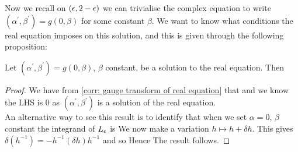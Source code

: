 \documentclass{article}
\begin{document}
Now we recall on $(\epsilon,2-\epsilon)$ we can trivialise the complex equation to write $(\alpha^\prime, \beta^\prime) = g(0,\beta)$ for some constant $\beta$. We want to know what conditions the real equation imposes on this solution, and this is given through the following proposition:
\begin{prop}
	Let $(\alpha^\prime, \beta^\prime) = g(0,\beta)$, $\beta$ constant, be a solution to the real equation. Then 
\end{prop}
\begin{proof}
We have from \ref{corr: gauge transform of real equation} that 
and we know the LHS is 0 as $(\alpha^\prime, \beta^\prime)$ is a solution of the real equation. \\
An alternative way to see this result is to identify that when we set $\alpha=0$, $\beta$ constant the integrand of $L_\epsilon$ is 
We now make a variation $h \mapsto h+\delta h$. This gives $\delta(h^{-1}) = -h^{-1} (\delta h) h^{-1}$ and so 
Hence 
The result follows. 
\end{proof}
\end{document}
